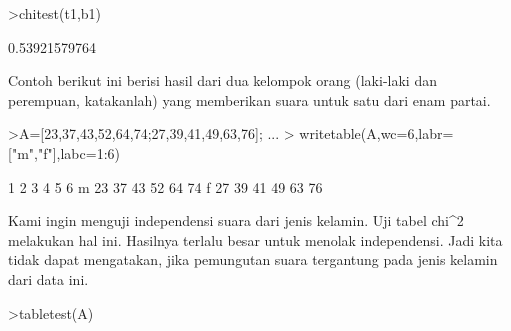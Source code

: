\documentclass[a4paper,10pt]{article}
\begin{document}
\begin{eulernotebook}
\begin{eulercomment}
\begin{eulercomment}
\begin{eulercomment}
\begin{eulercomment}
\begin{eulercomment}
\begin{eulercomment}
\begin{eulercomment}
\begin{eulercomment}
\begin{eulercomment}
\begin{eulercomment}
\begin{eulercomment}
\begin{eulercomment}
\begin{eulercomment}
\begin{eulercomment}
\begin{eulercomment}
\begin{eulercomment}
\begin{eulercomment}
\begin{eulercomment}
\begin{eulercomment}
\begin{eulercomment}
\begin{eulercomment}
\begin{eulercomment}
\begin{eulercomment}
\begin{eulercomment}
\begin{eulercomment}
\begin{eulercomment}
\begin{eulercomment}
\begin{eulercomment}
\begin{eulercomment}
\begin{eulercomment}
\begin{eulercomment}
\begin{eulercomment}
\begin{eulercomment}
\begin{eulercomment}
\begin{eulercomment}
\begin{eulercomment}
\begin{eulercomment}
\begin{eulercomment}
\begin{eulercomment}
\begin{eulercomment}
\begin{eulercomment}
\begin{eulercomment}
\begin{eulercomment}
\begin{eulercomment}
\begin{eulerprompt}
>chitest(t1,b1)
\end{eulerprompt}
\begin{euleroutput}
  0.53921579764
\end{euleroutput}
\begin{eulercomment}
Contoh berikut ini berisi hasil dari dua kelompok orang (laki-laki dan
perempuan, katakanlah) yang memberikan suara untuk satu dari enam
partai.
\end{eulercomment}
\begin{eulerprompt}
>A=[23,37,43,52,64,74;27,39,41,49,63,76];  ...
>  writetable(A,wc=6,labr=["m","f"],labc=1:6)
\end{eulerprompt}
\begin{euleroutput}
             1     2     3     4     5     6
       m    23    37    43    52    64    74
       f    27    39    41    49    63    76
\end{euleroutput}
\begin{eulercomment}
Kami ingin menguji independensi suara dari jenis kelamin. Uji tabel
chi\textasciicircum{}2 melakukan hal ini. Hasilnya terlalu besar untuk menolak
independensi. Jadi kita tidak dapat mengatakan, jika pemungutan suara
tergantung pada jenis kelamin dari data ini.
\end{eulercomment}
\begin{eulerprompt}
>tabletest(A)
\end{eulerprompt}
\begin{euleroutput}

\end{euleroutput}
\end{eulercomment}
\end{eulercomment}
\end{eulercomment}
\end{eulercomment}
\end{eulercomment}
\end{eulercomment}
\end{eulercomment}
\end{eulercomment}
\end{eulercomment}
\end{eulercomment}
\end{eulercomment}
\end{eulercomment}
\end{eulercomment}
\end{eulercomment}
\end{eulercomment}
\end{eulercomment}
\end{eulercomment}
\end{eulercomment}
\end{eulercomment}
\end{eulercomment}
\end{eulercomment}
\end{eulercomment}
\end{eulercomment}
\end{eulercomment}
\end{eulercomment}
\end{eulercomment}
\end{eulercomment}
\end{eulercomment}
\end{eulercomment}
\end{eulercomment}
\end{eulercomment}
\end{eulercomment}
\end{eulercomment}
\end{eulercomment}
\end{eulercomment}
\end{eulercomment}
\end{eulercomment}
\end{eulercomment}
\end{eulercomment}
\end{eulercomment}
\end{eulercomment}
\end{eulercomment}
\end{eulercomment}
\end{eulercomment}
\end{eulernotebook}
\end{document}
